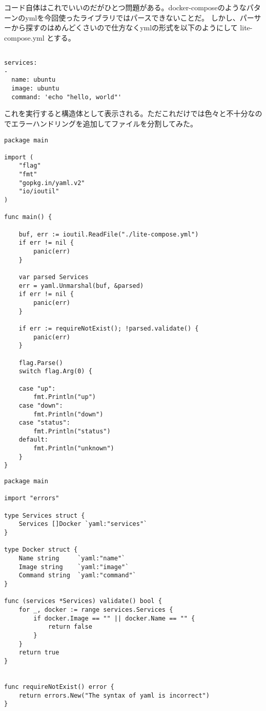 コード自体はこれでいいのだがひとつ問題がある。docker-composeのようなパターンのymlを今回使ったライブラリではパースできないことだ。
しかし、パーサーから探すのはめんどくさいので仕方なくymlの形式を以下のようにして lite-compose.yml とする。

\begin{verbatim}

services:
-
  name: ubuntu
  image: ubuntu
  command: 'echo "hello, world"'

\end{verbatim}

これを実行すると構造体として表示される。ただこれだけでは色々と不十分なのでエラーハンドリングを追加してファイルを分割してみた。

\begin{verbatim}
package main

import (
    "flag"
    "fmt"
    "gopkg.in/yaml.v2"
    "io/ioutil"
)

func main() {

    buf, err := ioutil.ReadFile("./lite-compose.yml")
    if err != nil {
        panic(err)
    }

    var parsed Services
    err = yaml.Unmarshal(buf, &parsed)
    if err != nil {
        panic(err)
    }

    if err := requireNotExist(); !parsed.validate() {
        panic(err)
    }

    flag.Parse()
    switch flag.Arg(0) {

    case "up":
        fmt.Println("up")
    case "down":
        fmt.Println("down")
    case "status":
        fmt.Println("status")
    default:
        fmt.Println("unknown")
    }
}
\end{verbatim}

\begin{verbatim}
package main

import "errors"

type Services struct {
    Services []Docker `yaml:"services"`
}

type Docker struct {
    Name string     `yaml:"name"`
    Image string    `yaml:"image"`
    Command string  `yaml:"command"`
}

func (services *Services) validate() bool {
    for _, docker := range services.Services {
        if docker.Image == "" || docker.Name == "" {
            return false
        }
    }
    return true
}


func requireNotExist() error {
    return errors.New("The syntax of yaml is incorrect")
}
\end{verbatim}

